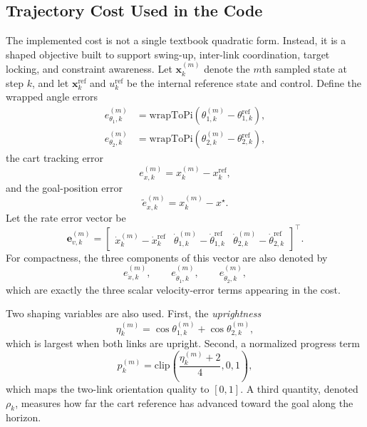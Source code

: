 \documentclass[conference]{IEEEtran}
\begin{document}
\subsection{Trajectory Cost Used in the Code}
The implemented cost is not a single textbook quadratic form. Instead, it is a shaped objective built to support swing-up, inter-link coordination, target locking, and constraint awareness. Let $\bm{x}_k^{(m)}$ denote the $m$th sampled state at step $k$, and let $\bm{x}_k^{\mathrm{ref}}$ and $u_k^{\mathrm{ref}}$ be the internal reference state and control. Define the wrapped angle errors
\begin{align}
e_{\theta_1,k}^{(m)} &= \mathrm{wrapToPi}\!\left(\theta_{1,k}^{(m)} - \theta_{1,k}^{\mathrm{ref}}\right), \\
e_{\theta_2,k}^{(m)} &= \mathrm{wrapToPi}\!\left(\theta_{2,k}^{(m)} - \theta_{2,k}^{\mathrm{ref}}\right),
\end{align}
the cart tracking error
\begin{equation}
e_{x,k}^{(m)} = x_k^{(m)} - x_k^{\mathrm{ref}},
\end{equation}
and the goal-position error
\begin{equation}
\tilde{e}_{x,k}^{(m)} = x_k^{(m)} - x^\star.
\end{equation}
Let the rate error vector be
\begin{equation}
\bm{e}_{v,k}^{(m)} = \begin{bmatrix}
\dot{x}_k^{(m)} - \dot{x}_k^{\mathrm{ref}} &
\dot{\theta}_{1,k}^{(m)} - \dot{\theta}_{1,k}^{\mathrm{ref}} &
\dot{\theta}_{2,k}^{(m)} - \dot{\theta}_{2,k}^{\mathrm{ref}}
\end{bmatrix}^\top.
\end{equation}
For compactness, the three components of this vector are also denoted by
\begin{equation}
e_{\dot{x},k}^{(m)}, \qquad e_{\dot{\theta}_1,k}^{(m)}, \qquad e_{\dot{\theta}_2,k}^{(m)},
\end{equation}
which are exactly the three scalar velocity-error terms appearing in the cost.

Two shaping variables are also used. First, the \emph{uprightness}
\begin{equation}
\eta_k^{(m)} = \cos\theta_{1,k}^{(m)} + \cos\theta_{2,k}^{(m)},
\end{equation}
which is largest when both links are upright. Second, a normalized progress term
\begin{equation}
p_k^{(m)} = \mathrm{clip}\!\left(\frac{\eta_k^{(m)} + 2}{4}, 0, 1\right),
\end{equation}
which maps the two-link orientation quality to $[0,1]$. A third quantity, denoted $\rho_k$, measures how far the cart reference has advanced toward the goal along the horizon.
\end{document}
